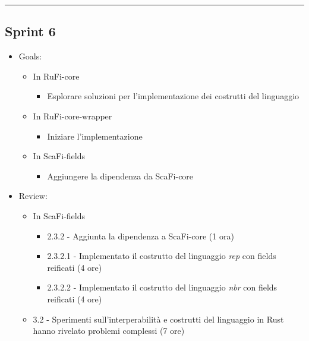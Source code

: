 \documentclass[12pt, a4paper]{article}
\begin{document}
\par\noindent\rule{\textwidth}{0.5pt}


\subsection*{Sprint 6}

\begin{itemize}
    \item Goals:
          \begin{itemize}
              \color{teal}
              \item In RuFi-core
                    \begin{itemize}
                        \item Esplorare soluzioni per l'implementazione dei costrutti del linguaggio
                    \end{itemize}
                    \color{magenta}
              \item In RuFi-core-wrapper
                    \begin{itemize}
                        \item Iniziare l'implementazione
                    \end{itemize}
                    \color{blue}

              \item In ScaFi-fields
                    \begin{itemize}
                        \item Aggiungere la dipendenza da ScaFi-core
                    \end{itemize}
          \end{itemize}
    \item Review:
          \begin{itemize}
              \color{blue}
              \item In ScaFi-fields
                    \begin{itemize}
                        \item 2.3.2 - Aggiunta la dipendenza a ScaFi-core (1 ora)
                        \item 2.3.2.1 - Implementato il costrutto del linguaggio \textit{rep} con fields reificati (4 ore)
                        \item 2.3.2.2 - Implementato il costrutto del linguaggio \textit{nbr} con fields reificati (4 ore)
                    \end{itemize}
              \item 3.2 - Sperimenti sull'interperabilità e costrutti del linguaggio in Rust hanno rivelato problemi complessi (7 ore)
          \end{itemize}
\end{itemize}
\end{document}
